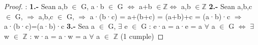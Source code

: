 \documentclass[10pt,a4paper,oneside]{article}
\begin{document}
				\begin{proof}:
					\newline
					\newline
					\textbf{1.-} Sean a,b $\in$ G, a·b $\in$ G $\iff$ a+b $\in \mathbb{Z} \iff$ a,b $\in \mathbb{Z}$
					\newline
					\newline
					\textbf{2.-} Sean a,b,c $\in$ G, $\Rightarrow$ a,b,c $\in$ G, $\Rightarrow$ a·(b·c) = a+(b+c) = (a+b)+c = (a·b)·c  $\Rightarrow$ a·(b·c)=(a·b)·c
					\newline
					\newline
					\textbf{3.-} Sea a $\in$ G, $\exists$ e $\in$ G : e·a = a·e = a $\forall$ a $\in$ G $\iff$  $\exists$ w $\in$ $\mathbb{Z}$ : w·a = a·w = a $\forall$ a $\in$ $\mathbb{Z}$ (1 cumple)
					\newline
					\newline
				\end{proof}
\end{document}
